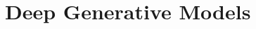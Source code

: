 \renewcommand{\prevpart}{9 }
\renewcommand{\thispart}{10 }
\renewcommand{\nextpart}{11 }

\section{Deep Generative Models}




